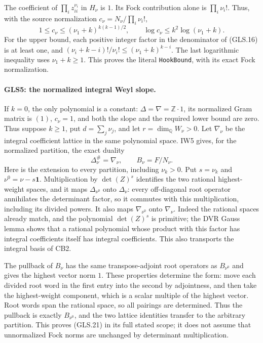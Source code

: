 The coefficient of $\prod_i z_{ii}^{\nu_i}$ in $H_\nu$ is $1$.
Its Fock contribution alone is $\prod_i\nu_i!$.  Thus, with the
source normalization $c_\nu=N_\nu/\prod_i\nu_i!$,
\[
 1\le c_\nu\le(\nu_1+k)^{k(k-1)/2},\qquad
 \log c_\nu\le k^2\log(\nu_1+k).             \tag{GLS.20}
\]
For the upper bound, each positive integer factor in the denominator
of (GLS.16) is at least one, and
$(\nu_i+k-i)!/\nu_i!\le(\nu_1+k)^{k-i}$.
The last logarithmic inequality uses $\nu_1+k\ge1$.
This proves the literal \texttt{HookBound}, with its exact Fock
normalization.

\paragraph{GLS5: the normalized integral Weyl slope.}
\label{claim:GLS5}
If $k=0$, the only polynomial is a constant:
$\Delta=\nabla=\mathbb Z\cdot1$, its normalized Gram matrix is
$(1)$, $c_\nu=1$, and both the slope and the required lower bound
are zero.  Thus suppose $k\ge1$, put $d=\sum_j\nu_j$, and let
$r=\dim_\mathbb Q W_\nu>0$.
Let $\nabla_\nu$ be the integral coefficient lattice in the same
polynomial space.  IW5 gives, for the normalized partition, the
exact duality
\[
 \Delta_\nu^{\#}=\nabla_\nu,\qquad
 B_\nu=F/N_\nu.                              \tag{GLS.21}
\]
Here is the extension to every partition, including $\nu_k>0$.
Put $s=\nu_k$ and $\nu^0=\nu-s\mathbf1$. Multiplication by
$\det(Z)^s$ identifies the two rational highest-weight spaces,
and it maps $\Delta_{\nu^0}$ onto $\Delta_\nu$: every
off-diagonal root operator annihilates the determinant factor,
so it commutes with this multiplication, including its divided
powers.  It also maps $\nabla_{\nu^0}$ onto $\nabla_\nu$.
Indeed the rational spaces already match, and the polynomial
$\det(Z)^s$ is primitive; the DVR Gauss lemma shows that a rational
polynomial whose product with this factor has integral coefficients
itself has integral coefficients.  This also transports the
integral basis of CB2.

The pullback of $B_\nu$ has the same transpose-adjoint root
operators as $B_{\nu^0}$ and gives the highest vector norm $1$.
These properties determine the form: move each divided root word
in the first entry into the second by adjointness, and then take
the highest-weight component, which is a scalar multiple of the
highest vector.  Root words span the rational space, so all
pairings are determined.  Thus the pullback is exactly $B_{\nu^0}$,
and the two lattice identities transfer to the arbitrary partition.
This proves (GLS.21) in its full stated scope; it does not assume
that unnormalized Fock norms are unchanged by determinant
multiplication.

